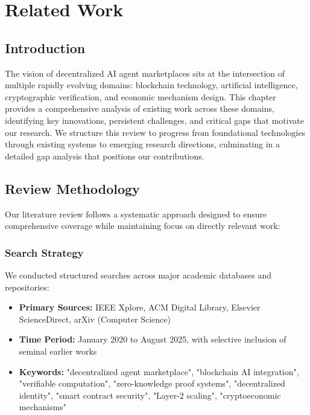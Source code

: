 \chapter{Related Work}
\label{chap:related_work}

\section{Introduction}

The vision of decentralized AI agent marketplaces sits at the intersection of multiple rapidly evolving domains: blockchain technology, artificial intelligence, cryptographic verification, and economic mechanism design. This chapter provides a comprehensive analysis of existing work across these domains, identifying key innovations, persistent challenges, and critical gaps that motivate our research. We structure this review to progress from foundational technologies through existing systems to emerging research directions, culminating in a detailed gap analysis that positions our contributions.

\section{Review Methodology}

Our literature review follows a systematic approach designed to ensure comprehensive coverage while maintaining focus on directly relevant work:

\subsection{Search Strategy}
We conducted structured searches across major academic databases and repositories:
\begin{itemize}
    \item \textbf{Primary Sources:} IEEE Xplore, ACM Digital Library, Elsevier ScienceDirect, arXiv (Computer Science)
    \item \textbf{Time Period:} January 2020 to August 2025, with selective inclusion of seminal earlier works
    \item \textbf{Keywords:} "decentralized agent marketplace", "blockchain AI integration", "verifiable computation", "zero-knowledge proof systems", "decentralized identity", "smart contract security", "Layer-2 scaling", "cryptoeconomic mechanisms"
\end{itemize}

